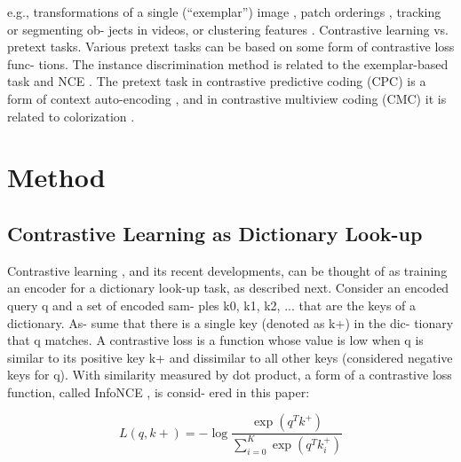 \documentclass[10pt,twocolumn]{article}  %
\begin{document}
e.g., transformations of a single (“exemplar”) image \cite{17_dosovitskiy2014discriminative},
patch orderings \cite{13_doersch2015unsupervised, 45_noroozi2016unsupervised}, tracking \cite{59_wang2015unsupervised} or segmenting ob-
jects \cite{47_vondrick2016generating} in videos, or clustering features \cite{3_caron2018deep, 4_caron2019unsupervised}.
Contrastive learning vs. pretext tasks. Various pretext
tasks can be based on some form of contrastive loss func-
tions. The instance discrimination method \cite{61_wu2018unsupervised} is related
to the exemplar-based task \cite{17_dosovitskiy2014discriminative} and NCE \cite{28_gutmann2010noise}. The pretext
task in contrastive predictive coding (CPC) \cite{46_oord2018representation} is a form
of context auto-encoding \cite{48_pathak2016context}, and in contrastive multiview
coding (CMC) \cite{56_tian2019contrastive} it is related to colorization \cite{64_zhang2016colorful}.

\section{Method}
\subsection{Contrastive Learning as Dictionary Look-up}
Contrastive learning \cite{29_hadsell2006dimensionality}, and its recent developments,
can be thought of as training an encoder for a dictionary
look-up task, as described next.
Consider an encoded query q and a set of encoded sam-
ples {k0, k1, k2, ...} that are the keys of a dictionary. As-
sume that there is a single key (denoted as k+) in the dic-
tionary that q matches. A contrastive loss \cite{29_hadsell2006dimensionality} is a function
whose value is low when q is similar to its positive key k+
and dissimilar to all other keys (considered negative keys
for q). With similarity measured by dot product, a form of
a contrastive loss function, called InfoNCE \cite{46_oord2018representation}, is consid-
ered in this paper:

\begin{equation}
    L(q, k+) = -\log\frac{\exp(q^T k^+)}{\sum_{i=0}^K \exp(q^T k_i^+)}
    \label{eq:equation1}
\end{equation}
\end{document}
